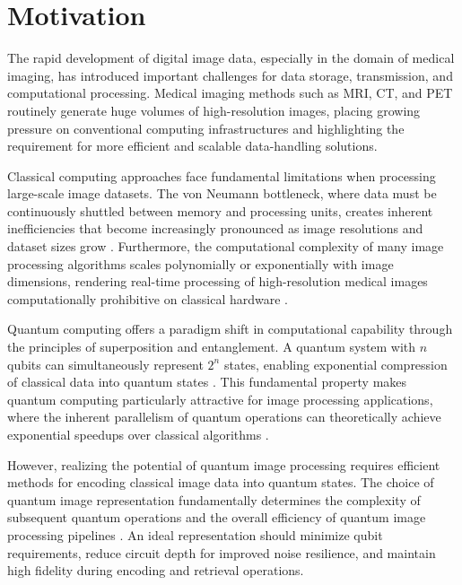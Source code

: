 \documentclass[pdflatex,sn-mathphys-num,Numbered]{sn-jnl}
\theoremstyle{thmstyleone}
\theoremstyle{thmstyletwo}
\theoremstyle{thmstylethree}
\begin{document}

\section{Motivation}\label{sec:motivation}

The rapid development of digital image data, especially in the domain of medical imaging, has introduced important challenges for data storage, transmission, and computational processing. Medical imaging methods such as MRI, CT, and PET routinely generate huge volumes of high-resolution images, placing growing pressure on conventional computing infrastructures and highlighting the requirement  for more efficient and scalable data-handling solutions\cite{bib43}.

Classical computing approaches face fundamental limitations when processing large-scale image datasets. The von Neumann bottleneck, where data must be continuously shuttled between memory and processing units, creates inherent inefficiencies that become increasingly pronounced as image resolutions and dataset sizes grow \cite{bib44}. Furthermore, the computational complexity of many image processing algorithms scales polynomially or exponentially with image dimensions, rendering real-time processing of high-resolution medical images computationally prohibitive on classical hardware \cite{bib45}.

Quantum computing offers a paradigm shift in computational capability through the principles of superposition and entanglement. A quantum system with $n$ qubits can simultaneously represent $2^n$ states, enabling exponential compression of classical data into quantum states \cite{bib2}. This fundamental property makes quantum computing particularly attractive for image processing applications, where the inherent parallelism of quantum operations can theoretically achieve exponential speedups over classical algorithms \cite{bib12}.

However, realizing the potential of quantum image processing requires efficient methods for encoding classical image data into quantum states. The choice of quantum image representation fundamentally determines the complexity of subsequent quantum operations and the overall efficiency of quantum image processing pipelines \cite{bib14}. An ideal representation should minimize qubit requirements, reduce circuit depth for improved noise resilience, and maintain high fidelity during encoding and retrieval operations.
\end{document}
